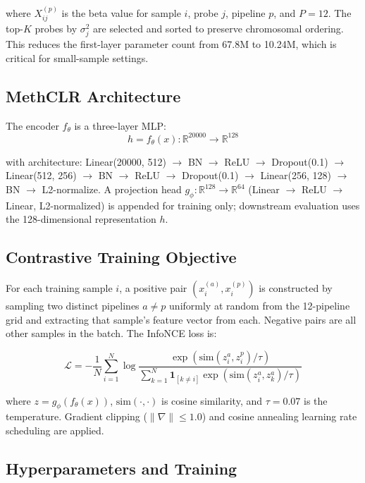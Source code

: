 \documentclass[conference]{IEEEtran}
\begin{document}
where $X^{(p)}_{ij}$ is the beta value for sample $i$, probe $j$, pipeline $p$, and $P=12$. The top-$K$ probes by $\sigma^2_j$ are selected and sorted to preserve chromosomal ordering. This reduces the first-layer parameter count from 67.8M to 10.24M, which is critical for small-sample settings.

\subsection{MethCLR Architecture}

The encoder $f_\theta$ is a three-layer MLP:
\begin{equation}
h = f_\theta(x) : \mathbb{R}^{20000} \to \mathbb{R}^{128}
\end{equation}

with architecture: Linear(20000, 512) $\to$ BN $\to$ ReLU $\to$ Dropout(0.1) $\to$ Linear(512, 256) $\to$ BN $\to$ ReLU $\to$ Dropout(0.1) $\to$ Linear(256, 128) $\to$ BN $\to$ L2-normalize. A projection head $g_\phi: \mathbb{R}^{128} \to \mathbb{R}^{64}$ (Linear $\to$ ReLU $\to$ Linear, L2-normalized) is appended for training only; downstream evaluation uses the 128-dimensional representation $h$.

\subsection{Contrastive Training Objective}

For each training sample $i$, a positive pair $(x_i^{(a)}, x_i^{(p)})$ is constructed by sampling two distinct pipelines $a \neq p$ uniformly at random from the 12-pipeline grid and extracting that sample's feature vector from each. Negative pairs are all other samples in the batch. The InfoNCE loss \cite{oord2018} is:

\begin{equation}
\mathcal{L} = -\frac{1}{N}\sum_{i=1}^{N} \log \frac{\exp(\text{sim}(z_i^a, z_i^p)/\tau)}{\sum_{k=1}^{N} \mathbf{1}_{[k \neq i]} \exp(\text{sim}(z_i^a, z_k^a)/\tau)}
\label{eq:infonce}
\end{equation}

where $z = g_\phi(f_\theta(x))$, $\text{sim}(\cdot,\cdot)$ is cosine similarity, and $\tau = 0.07$ is the temperature. Gradient clipping ($\|\nabla\| \leq 1.0$) and cosine annealing learning rate scheduling are applied.

\subsection{Hyperparameters and Training}
\end{document}
